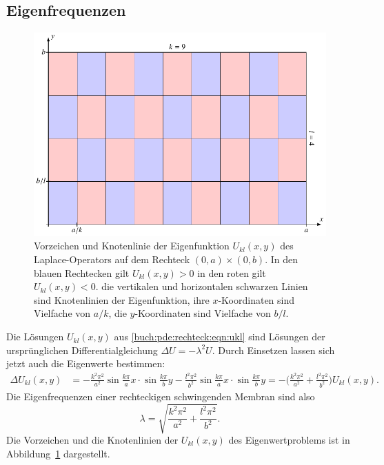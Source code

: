\subsection{Eigenfrequenzen}
\begin{figure}
\centering
\includegraphics{chapters/090-pde/images/rechteck.pdf}
\caption{Vorzeichen und Knotenlinie der Eigenfunktion
$U_{kl}(x,y)$ des Laplace-Operators auf dem Rechteck $(0,a)\times (0,b)$.
In den blauen Rechtecken gilt $U_{kl}(x,y)>0$ in den roten gilt
$U_{kl}(x,y)<0$.
die vertikalen und horizontalen schwarzen Linien sind Knotenlinien
der Eigenfunktion, ihre $x$-Koordinaten sind Vielfache von $a/k$,
die $y$-Koordinaten sind Vielfache von $b/l$.
\label{buch:pde:rechteck:fig:knoten}}
\end{figure}
Die Lösungen $U_{kl}(x,y)$ aus \eqref{buch:pde:rechteck:eqn:ukl}
sind Lösungen der ursprünglichen Differentialgleichung 
$\Delta U=-\lambda^2 U$.
Durch Einsetzen lassen sich jetzt auch die Eigenwerte bestimmen:
\begin{align*}
\Delta U_{kl}(x,y)
&=
-\frac{k^2\pi^2}{a^2} \sin\frac{k\pi}{a}x\cdot \sin\frac{k\pi}{b}y
-\frac{l^2\pi^2}{b^2} \sin\frac{k\pi}{a}x\cdot \sin\frac{k\pi}{b}y
=
-\biggl(\frac{k^2\pi^2}{a^2}+\frac{l^2\pi^2}{b^2}\biggr) U_{kl}(x,y).
\end{align*}
Die Eigenfrequenzen einer rechteckigen schwingenden Membran sind also
\[
\lambda
=
\sqrt{
\frac{k^2\pi^2}{a^2}+\frac{l^2\pi^2}{b^2}
}.
\]
Die Vorzeichen und die Knotenlinien der $U_{kl}(x,y)$ des
Eigenwertproblems ist in Abbildung~\ref{buch:pde:rechteck:fig:knoten}
dargestellt.

